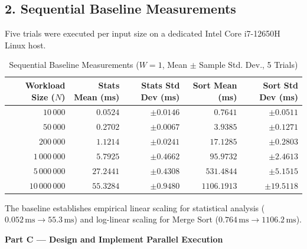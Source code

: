 \documentclass[11pt]{article}
\begin{document}
\subsection*{2. Sequential Baseline Measurements}
Five trials were executed per input size on a dedicated Intel Core i7-12650H Linux host.

\begin{table}[h!]
\centering
\small
\caption{Sequential Baseline Measurements ($W = 1$, Mean $\pm$ Sample Std. Dev., 5 Trials)}
\label{tab:seq_baseline}
\begin{tabular}{r r r r r}
\toprule
\textbf{Workload Size ($N$)} & \textbf{Stats Mean (ms)} & \textbf{Stats Std Dev (ms)} & \textbf{Sort Mean (ms)} & \textbf{Sort Std Dev (ms)} \\
\midrule
$10\,000$       & $0.0524$   & $\pm 0.0146$ & $0.7641$    & $\pm 0.0511$ \\
$50\,000$       & $0.2702$   & $\pm 0.0067$ & $3.9385$    & $\pm 0.1271$ \\
$200\,000$      & $1.1214$   & $\pm 0.0241$ & $17.1285$   & $\pm 0.2803$ \\
$1\,000\,000$   & $5.7925$   & $\pm 0.4662$ & $95.9732$   & $\pm 2.4613$ \\
$5\,000\,000$   & $27.2441$  & $\pm 0.4308$ & $531.4844$  & $\pm 5.1515$ \\
$10\,000\,000$  & $55.3284$  & $\pm 0.9480$ & $1106.1913$ & $\pm 19.5118$ \\
\bottomrule
\end{tabular}
\end{table}

The baseline establishes empirical linear scaling for statistical analysis ($0.052\,\text{ms} \to 55.3\,\text{ms}$) and log-linear scaling for Merge Sort ($0.764\,\text{ms} \to 1106.2\,\text{ms}$).

\newpage

{\centering\fontsize{14}{17}\selectfont\textbf{Part C --- Design and Implement Parallel Execution}\par}
\vspace{0.6em}
\end{document}
